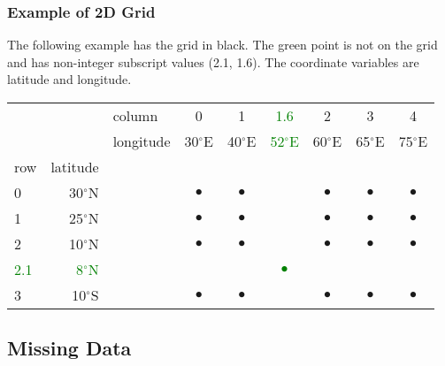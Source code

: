 \subsubsection{Example of 2D Grid}
    \label{grid-ex2dgrid}

The following example has the grid in black. The green point is not
  on the grid and has non-integer subscript values (2.1, 1.6). The
  coordinate variables are latitude and longitude.

    \begin{tabular}{|lrl|cccccc|}
      \hline 
         & 
         & 
        column & 
        0 & 
        1 & 
	\textcolor{green}{1.6}
         & 
        2 & 
        3 & 
        4
      \\
         & 
         & 
        longitude & 
        30$^{\circ}$E & 
        40$^{\circ}$E & 
	\textcolor{green}{52$^{\circ}$E}
         & 
        60$^{\circ}$E & 
        65$^{\circ}$E & 
        75$^{\circ}$E
      \\
        row & 
        latitude
         & 
         & 
         & 
         & 
         & 
         & 
         & 
      \\
      \hline 
        0 & 
        30$^{\circ}$N & 
         & 
        $\bullet$ & 
        $\bullet$ & 
         & 
        $\bullet$ & 
        $\bullet$ & 
        $\bullet$
      \\
        1 & 
        25$^{\circ}$N & 
         & 
        $\bullet$ & 
        $\bullet$ & 
         & 
        $\bullet$ & 
        $\bullet$ & 
        $\bullet$ 
      \\
        2 & 
        10$^{\circ}$N & 
         & 
        $\bullet$ & 
        $\bullet$ & 
         & 
        $\bullet$ & 
        $\bullet$ & 
        $\bullet$ 
      \\
	\textcolor{green}{2.1}
         & 
	\textcolor{green}{8$^{\circ}$N}
         & 
         & 
         & 
         & 
\textcolor{green}{$\bullet$}
         & 
         & 
         & 
      \\
        3 & 
        10$^{\circ}$S & 
         & 
        $\bullet$ & 
        $\bullet$ & 
         & 
        $\bullet$ & 
        $\bullet$ & 
        $\bullet$
      \\
      \hline 
\end{tabular}

\subsection{Missing Data}
    \label{grid-Missing}

